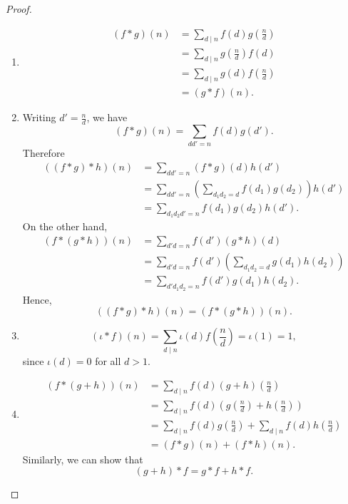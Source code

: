 \begin{proof}
    \begin{enumerate}
        \item \begin{align*}
            (f \ast g)(n) &= \sum_{d\mid n} f(d) g\left(\frac{n}{d}\right) \\
            &= \sum_{d\mid n} g\left(\frac{n}{d}\right) f(d) \\
            &= \sum_{d\mid n} g(d) f\left(\frac{n}{d}\right) \\
            &= (g \ast f)(n).
        \end{align*}
    
    \item Writing \( d' = \frac{n}{d} \), we have
    \[
    (f * g)(n) = \sum_{dd' = n} f(d)g(d').
\]
Therefore
\begin{align*}
    ((f * g) * h)(n)
    &= \sum_{dd' = n} (f * g)(d) h(d') \\
    &= \sum_{dd' = n} \left( \sum_{d_1 d_2 = d} f(d_1)g(d_2) \right) h(d') \\
    &= \sum_{d_1 d_2 d' = n} f(d_1)g(d_2)h(d').
\end{align*}
\noindent
On the other hand,
\begin{align*}
    (f * (g * h))(n)
    &= \sum_{d'd = n} f(d') (g * h)(d) \\
    &= \sum_{d'd = n} f(d') \left( \sum_{d_1 d_2 = d} g(d_1) h(d_2) \right) \\
    &= \sum_{d' d_1 d_2 = n} f(d') g(d_1) h(d_2).
\end{align*}
Hence, \[((f \ast g) \ast h)(n) = (f \ast (g \ast h))(n).\]

\item \[(\iota \ast f)(n) = \sum_{d\mid n} \iota(d) f\left(\frac{n}{d}\right) = \iota(1) = 1,\]
since $\iota(d) = 0$ for all $d > 1$.

\item \begin{align*}
    (f \ast (g + h))(n) &= \sum_{d\mid n} f(d) (g + h)\left(\frac{n}{d}\right) \\
    &= \sum_{d\mid n} f(d) \left(g\left(\frac{n}{d}\right) + h\left(\frac{n}{d}\right)\right) \\
    &= \sum_{d\mid n} f(d) g\left(\frac{n}{d}\right) + \sum_{d\mid n} f(d) h\left(\frac{n}{d}\right) \\
    &= (f \ast g)(n) + (f \ast h)(n).
\end{align*}
Similarly, we can show that \[(g + h) \ast f = g \ast f + h \ast f.\]
\end{enumerate}
\end{proof}

